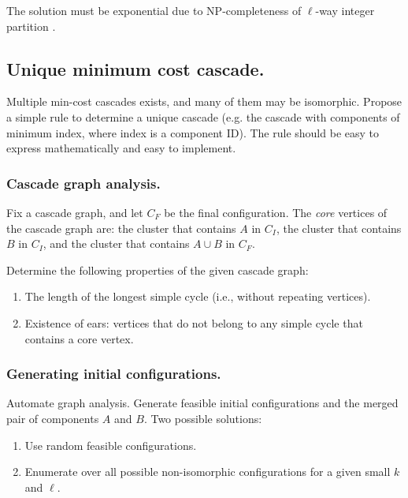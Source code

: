\documentclass[a4paper,USenglish]{lipics-v2019}
\begin{document}
\noindent The solution must be exponential due to NP-completeness of $\ell$-way integer
partition \cite{AndRae06}.
\subsection{Unique minimum cost cascade.}
Multiple min-cost cascades exists, and many of them may be isomorphic. Propose a
simple rule to determine a unique cascade (e.g. the cascade with components of
minimum index, where index is a component ID). The rule should be easy to
express mathematically and easy to implement.

\subsubsection{Cascade graph analysis.}

Fix a cascade graph, and let $C_F$ be the final configuration.
The \emph{core} vertices of the cascade graph are: the cluster that contains $A$
in $C_I$, the cluster that contains $B$ in $C_I$, and the cluster that contains
$A\cup B$ in $C_F$.

Determine the following properties of the given cascade graph:
\begin{enumerate}
    \item The length of the longest simple cycle (i.e., without repeating
        vertices).
    \item Existence of ears: vertices that do not belong to any simple cycle
        that contains a core vertex.
\end{enumerate}

\subsubsection{Generating initial configurations.}

Automate graph analysis. Generate feasible initial configurations and the
merged pair of components $A$ and $B$. Two
possible solutions:
\begin{enumerate}
    \item Use
random feasible configurations.
\item Enumerate over all possible non-isomorphic configurations for a given small $k$
    and $\ell$.
\end{enumerate}

  
  


\appendix
\end{document}

